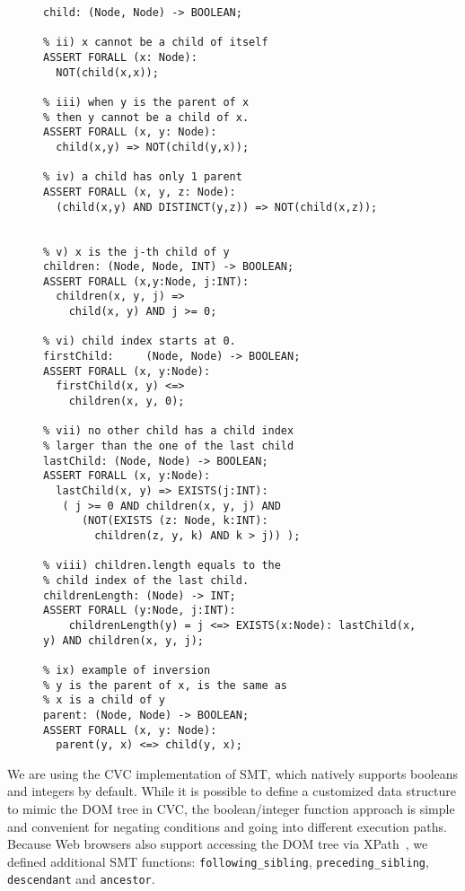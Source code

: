 \begin{figure}
\begin{lstlisting}[caption=SMT functions for defining the children.length DOM operation.  We start with defining the parent-child relationships; then move on to the ordering of children; then use the child index of the last child to define and quantify the {\tt childrenLength()} boolean function,label=childrenLength]  
% i) child(x, y): x is a child of y.
child: (Node, Node) -> BOOLEAN;	

% ii) x cannot be a child of itself
ASSERT FORALL (x: Node):	
  NOT(child(x,x));
	
% iii) when y is the parent of x
% then y cannot be a child of x.  
ASSERT FORALL (x, y: Node):
  child(x,y) => NOT(child(y,x));
  
% iv) a child has only 1 parent
ASSERT FORALL (x, y, z: Node):
  (child(x,y) AND DISTINCT(y,z)) => NOT(child(x,z));

  
% v) x is the j-th child of y 
children: (Node, Node, INT) -> BOOLEAN;
ASSERT FORALL (x,y:Node, j:INT): 
  children(x, y, j) => 
    child(x, y) AND j >= 0;

% vi) child index starts at 0.
firstChild:		(Node, Node) -> BOOLEAN;
ASSERT FORALL (x, y:Node):
  firstChild(x, y) <=> 
    children(x, y, 0);

% vii) no other child has a child index 
% larger than the one of the last child
lastChild: (Node, Node) -> BOOLEAN;	
ASSERT FORALL (x, y:Node): 	
  lastChild(x, y) => EXISTS(j:INT): 
   ( j >= 0 AND children(x, y, j) AND 
      (NOT(EXISTS (z: Node, k:INT): 
	    children(z, y, k) AND k > j)) );

% viii) children.length equals to the
% child index of the last child.
childrenLength:	(Node) -> INT;
ASSERT FORALL (y:Node, j:INT):
	childrenLength(y) = j <=> EXISTS(x:Node): lastChild(x, y) AND children(x, y, j);

% ix) example of inversion
% y is the parent of x, is the same as 
% x is a child of y
parent: (Node, Node) -> BOOLEAN; 
ASSERT FORALL (x, y: Node): 
  parent(y, x) <=> child(y, x); 
\end{lstlisting} 
\end{figure}

We are using the CVC implementation of SMT, which natively supports booleans and integers by default.  
While it is possible to define a customized data structure to mimic the DOM tree in CVC, the boolean/integer function approach is simple and convenient for negating conditions and going into different execution paths.
Because Web browsers also support accessing the DOM tree via XPath~\cite{documentEvaluate}, we defined additional SMT functions: {\tt following\_sibling}, {\tt preceding\_sibling}, {\tt descendant} and {\tt ancestor}.

